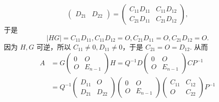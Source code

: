 \begin{enumerate}
\begin{enumerate}
\begin{enumerate}
\[\begin{pmatrix}
                                      D_{21} & D_{22}
                                  \end{pmatrix} = \begin{pmatrix}
                                      C_{11}D_{11} & C_{11}D_{12} \\
                                      C_{21}D_{11} & C_{21}D_{12}
                                  \end{pmatrix},\]
                              于是
                              \[\lvert HG \rvert = C_{11}D_{11}, C_{11}D_{12} = O, C_{21}D_{11} = O, C_{21}D_{12} = O.\]
                              因为 $H, G$ 可逆，所以 $C_{11} \neq 0, D_{11} \neq 0$，于是 $C_{21} = O = D_{12}$. 从而
                              \begin{align*}
                                  A & = G\begin{pmatrix}
                                             0 & O       \\
                                             O & E_{n-1}
                                         \end{pmatrix}H
                                  = Q^{-1}D\begin{pmatrix}
                                               0 & O       \\
                                               O & E_{n-1}
                                           \end{pmatrix}CP^{-1}      \\
                                    & = Q^{-1}\begin{pmatrix}
                                                  D_{11} & O      \\
                                                  D_{21} & D_{22}
                                              \end{pmatrix}
                                  \begin{pmatrix}
                                      0 & O       \\
                                      O & E_{n-1}
                                  \end{pmatrix}
                                  \begin{pmatrix}
                                      C_{11} & C_{12} \\
                                      O      & C_{22}
                                  \end{pmatrix} P^{-1}               \\

\end{align*}
\end{enumerate}
\end{enumerate}
\end{enumerate}
